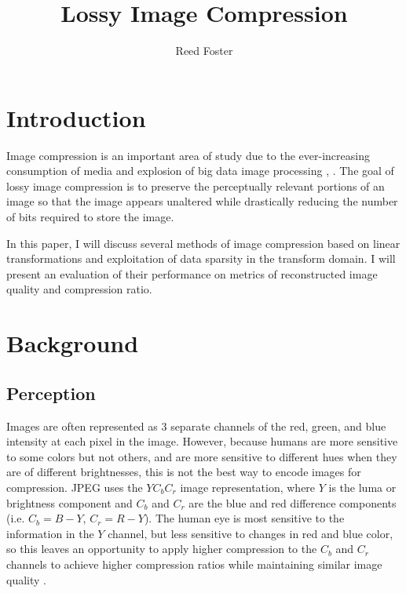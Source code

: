 \documentclass[conference]{IEEEtran}
\begin{document}
\title{Lossy Image Compression}

\author{Reed Foster}

\maketitle

%

\section{Introduction}

Image compression is an important area of study due to the ever-increasing consumption of media and explosion of big data image processing \cite{imgProcessingTinkuAcharya}, \cite{scnn}.
The goal of lossy image compression is to preserve the perceptually relevant portions of an image so that the image appears unaltered while drastically reducing the number of bits required to store the image.

In this paper, I will discuss several methods of image compression based on linear transformations and exploitation of data sparsity in the transform domain.
I will present an evaluation of their performance on metrics of reconstructed image quality and compression ratio.

\section{Background}

\subsection{Perception}
Images are often represented as 3 separate channels of the red, green, and blue intensity at each pixel in the image.
However, because humans are more sensitive to some colors but not others, and are more sensitive to different hues when they are of different brightnesses, this is not the best way to encode images for compression.
JPEG uses the $YC_bC_r$ image representation, where $Y$ is the luma or brightness component and $C_b$ and $C_r$ are the blue and red difference components (i.e. $C_b = B - Y$, $C_r = R - Y$).
The human eye is most sensitive to the information in the $Y$ channel, but less sensitive to changes in red and blue color, so this leaves an opportunity to apply higher compression to the $C_b$ and $C_r$ channels to achieve higher compression ratios while maintaining similar image quality \cite{hvsYcbcr}.
\end{document}
